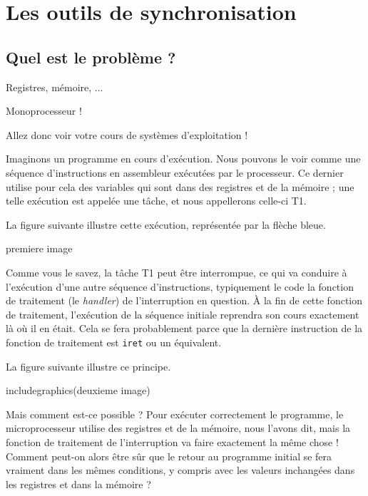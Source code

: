 %
\section{Les outils de synchronisation}

%
\subsection{Quel est le problème ?}

Registres, mémoire, ...

Monoprocesseur !

   Allez donc voir votre cours de systèmes d'exploitation !

   Imaginons un programme en cours d'exécution. Nous pouvons le voir
comme une séquence d'instructions en assembleur exécutées par le
processeur. Ce dernier utilise pour cela des variables qui sont dans
des registres et de la mémoire ; une telle exécution est appelée une
tâche, et nous appellerons celle-ci T1. 

   La figure suivante illustre cette exécution, représentée par la
flèche bleue.

premiere image

   Comme vous le savez, la tâche T1 peut être
interrompue, ce qui va conduire à l'exécution d'une autre séquence
d'instructions, typiquement le code la fonction de traitement (le {\em
  handler}) de l'interruption en question. À la fin de cette fonction
de traitement, l'exécution de la séquence initiale reprendra son
cours exactement là où il en était. Cela se fera probablement parce
que la dernière instruction de la fonction de traitement est
\lstinline!iret! ou un équivalent.

   La figure suivante illustre ce principe.

includegraphics(deuxieme image)

   Mais comment est-ce possible ? Pour exécuter correctement le
programme, le microprocesseur utilise des registres et de la mémoire,
nous l'avons dit, mais la fonction de traitement de l'interruption va
faire exactement la même chose ! Comment peut-on alors être sûr que le
retour au programme initial se fera vraiment dans les mêmes
conditions, y compris avec les valeurs inchangées dans les registres
et dans la mémoire ?

